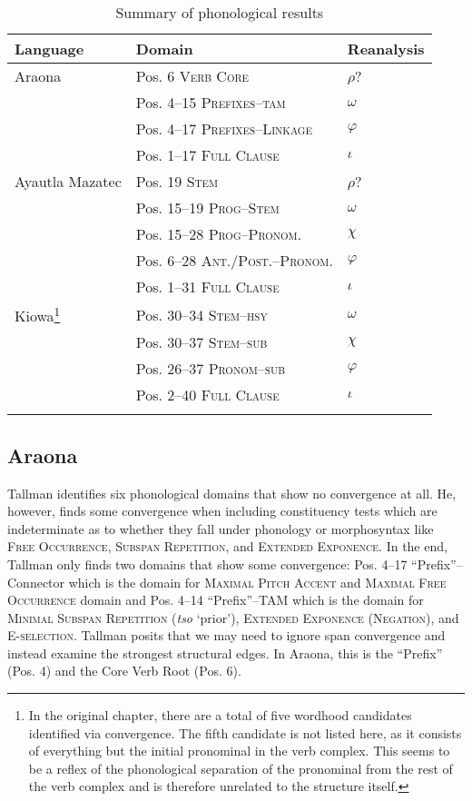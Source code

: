 \documentclass[output=paper]{langscibook}
\begin{document}
\begin{table}
    \begin{tabular}{lll}
    \lsptoprule Language & Domain & Reanalysis \\ \midrule
           Araona & Pos. 6 \textsc{Verb Core} & $\rho$? \\
            & Pos. 4--15 \textsc{Prefixes--tam} & $\omega$ \\
            & Pos. 4--17 \textsc{Prefixes--Linkage} & $\varphi$ \\
            & Pos. 1--17 \textsc{Full Clause} & $\iota$ \\
            \midrule
           Ayautla Mazatec & Pos. 19 \textsc{Stem} & $\rho$? \\
            & Pos. 15--19 \textsc{Prog--Stem} & $\omega$ \\
            & Pos. 15--28 \textsc{Prog--Pronom.} & $\chi$ \\
            & Pos. 6--28 \textsc{Ant./Post.--Pronom.} & $\varphi$ \\
            & Pos. 1--31 \textsc{Full Clause} & $\iota$ \\
             \midrule
           Kiowa\footnote{In the original chapter, there are a total of five wordhood candidates identified via convergence. The fifth candidate is not listed here, as it consists of everything but the initial pronominal in the verb complex. This seems to be a reflex of the phonological separation of the pronominal from the rest of the verb complex and is therefore unrelated to the structure itself.} & Pos. 30--34 \textsc{Stem--hsy} & $\omega$ \\
            & Pos. 30--37 \textsc{Stem--sub} & $\chi$ \\
            & Pos. 26--37 \textsc{Pronom--sub} & $\varphi$ \\
            & Pos. 2--40 \textsc{Full Clause} & $\iota$ \\ \lspbottomrule
    \end{tabular}
    \caption{Summary of phonological results}
    \label{tab:summarytable}
\end{table}

\subsection{Araona}

Tallman identifies six phonological domains that show no convergence at all. He, however, finds some convergence when including constituency tests which are indeterminate as to whether they fall under phonology or morphosyntax like {\textsc{Free Occurrence}}, {\textsc{Subspan Repetition}}, and {\textsc{Extended Exponence}}. In the end, Tallman only finds two domains that show some convergence: Pos. 4--17 ``Prefix''--Connector which is the domain for {\textsc{Maximal Pitch Accent}} and {\textsc{Maximal Free Occurrence}} domain and Pos. 4--14 ``Prefix''--TAM which is the domain for {\textsc{Minimal Subspan Repetition}} (\textit{tso} `prior'), {\textsc{Extended Exponence (Negation)}}, and {\textsc{E-selection}}. Tallman posits that we may need to ignore span convergence and instead examine the strongest structural edges. In Araona, this is the ``Prefix'' (Pos. 4) and the Core Verb Root (Pos. 6).
\end{document}
